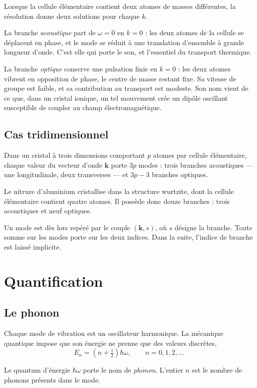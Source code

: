 \documentclass[11pt,a4paper]{article}
\begin{document}
Lorsque la cellule élémentaire contient deux atomes de masses différentes, la résolution donne deux
solutions pour chaque $k$.

La branche \emph{acoustique} part de $\omega = 0$ en $k = 0$ : les deux atomes de la cellule se
déplacent en phase, et le mode se réduit à une translation d'ensemble à grande longueur d'onde.
C'est elle qui porte le son, et l'essentiel du transport thermique.

La branche \emph{optique} conserve une pulsation finie en $k = 0$ : les deux atomes vibrent en
opposition de phase, le centre de masse restant fixe. Sa vitesse de groupe est faible, et sa
contribution au transport est modeste. Son nom vient de ce que, dans un cristal ionique, un tel
mouvement crée un dipôle oscillant susceptible de coupler au champ électromagnétique.

\subsection{Cas tridimensionnel}

Dans un cristal à trois dimensions comportant $p$ atomes par cellule élémentaire, chaque valeur du
vecteur d'onde $\mathbf{k}$ porte $3p$ modes : trois branches acoustiques --- une longitudinale,
deux transverses --- et $3p - 3$ branches optiques.

Le nitrure d'aluminium cristallise dans la structure wurtzite, dont la cellule élémentaire contient
quatre atomes. Il possède donc douze branches : trois acoustiques et neuf optiques.

Un mode est dès lors repéré par le couple $(\mathbf{k}, s)$, où $s$ désigne la branche. Toute somme
sur les modes porte sur les deux indices. Dans la suite, l'indice de branche est laissé implicite.

\section{Quantification}

\subsection{Le phonon}

Chaque mode de vibration est un oscillateur harmonique. La mécanique quantique impose que son
énergie ne prenne que des valeurs discrètes,
\[ E_n = \left(n + \tfrac{1}{2}\right)\hbar\omega , \qquad n = 0, 1, 2, \ldots \]

Le quantum d'énergie $\hbar\omega$ porte le nom de \emph{phonon}. L'entier $n$ est le nombre de
phonons présents dans le mode.
\end{document}

